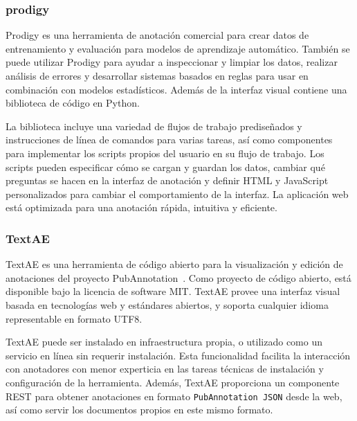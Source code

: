 \subsubsection*{prodigy}

Prodigy es una herramienta de anotación comercial para crear datos de entrenamiento y evaluación para modelos de aprendizaje automático.
También se puede utilizar Prodigy para ayudar a inspeccionar y limpiar los datos, realizar análisis de errores y desarrollar sistemas basados en reglas para usar en combinación con modelos estadísticos.
Además de la interfaz visual contiene una biblioteca de código en Python.

La biblioteca incluye una variedad de flujos de trabajo prediseñados y instrucciones de línea de comandos para varias tareas, así como componentes para implementar los scripts propios del usuario en su flujo de trabajo.
Los scripts pueden especificar cómo se cargan y guardan los datos, cambiar qué preguntas se hacen en la interfaz de anotación y definir HTML y JavaScript personalizados para cambiar el comportamiento de la interfaz.
La aplicación web está optimizada para una anotación rápida, intuitiva y eficiente.


\subsubsection*{TextAE}

TextAE es una herramienta de código abierto para la visualización y edición de anotaciones del proyecto PubAnnotation~\cite{pubannotation}.
Como proyecto de código abierto, está disponible bajo la licencia de software MIT.
TextAE provee una interfaz visual basada en tecnologías web y estándares abiertos, y soporta cualquier idioma representable en formato UTF8.

TextAE puede ser instalado en infraestructura propia, o utilizado como un servicio en línea sin requerir instalación.
Esta funcionalidad facilita la interacción con anotadores con menor experticia en las tareas técnicas de instalación y configuración de la herramienta.
Además, TextAE proporciona un componente REST para obtener anotaciones en formato \texttt{PubAnnotation JSON} desde la web, así como servir los documentos propios en este mismo formato.

